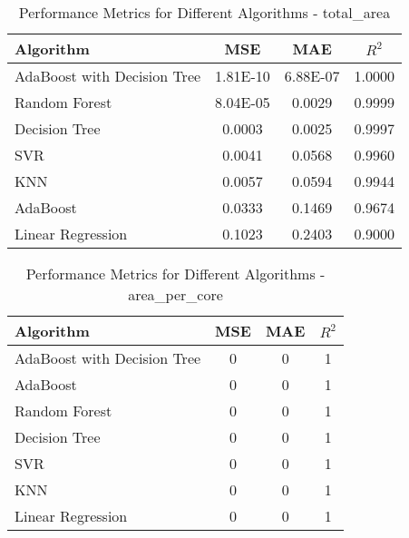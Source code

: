 \documentclass[conference]{IEEEtran}
\begin{document}
\begin{table}[ht]
	\centering
	\caption{Performance Metrics for Different Algorithms - total\_area}
	\label{tab:total_area}
	\begin{tabular}{lccc}
		\toprule
		\textbf{Algorithm} & \textbf{MSE} & \textbf{MAE} & \textbf{\(R^2\)} \\
		\midrule
		AdaBoost with Decision Tree & 1.81E-10 & 6.88E-07 & 1.0000 \\
		Random Forest & 8.04E-05 & 0.0029 & 0.9999 \\
		Decision Tree & 0.0003 & 0.0025 & 0.9997 \\
		SVR & 0.0041 & 0.0568 & 0.9960 \\
		KNN & 0.0057 & 0.0594 & 0.9944 \\
		AdaBoost & 0.0333 & 0.1469 & 0.9674 \\
		Linear Regression & 0.1023 & 0.2403 & 0.9000 \\
		\bottomrule
	\end{tabular}
\end{table}

\begin{table}[ht]
	\centering
	\caption{Performance Metrics for Different Algorithms - area\_per\_core}
	\label{tab:area_per_core}
	\begin{tabular}{lccc}
		\toprule
		\textbf{Algorithm} & \textbf{MSE} & \textbf{MAE} & \textbf{\(R^2\)} \\
		\midrule
		AdaBoost with Decision Tree & 0 & 0 & 1 \\
		AdaBoost & 0 & 0 & 1 \\
		Random Forest & 0 & 0 & 1 \\
		Decision Tree & 0 & 0 & 1 \\
		SVR & 0 & 0 & 1 \\
		KNN & 0 & 0 & 1 \\
		Linear Regression & 0 & 0 & 1 \\
		\bottomrule
	\end{tabular}
\end{table}
\end{document}
